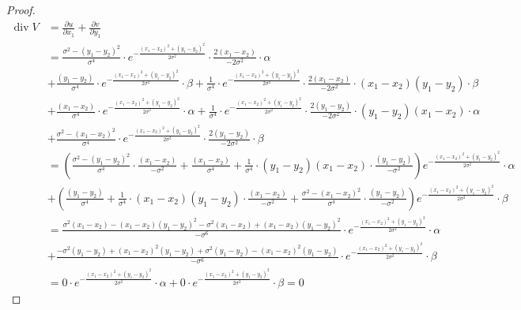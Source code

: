 \documentclass{article}
\theoremstyle{definition}
\theoremstyle{plain}
\begin{document}
\begin{proof}
\begin{align*}
    \operatorname{div} V&=\frac{\partial u}{\partial x_1}+\frac{\partial v}{\partial y_1}\\
    &=\frac{\sigma^2-(y_1-y_2)^2}{\sigma^4}\cdot e^{-\frac{(x_1-x_2)^2+(y_1-y_2)^2}{2\sigma^2}}\cdot\frac{2(x_1-x_2)}{-2\sigma^2}\cdot\alpha\\
    &+\frac{(y_1-y_2)}{\sigma^4}\cdot e^{-\frac{(x_1-x_2)^2+(y_1-y_2)^2}{2\sigma^2}}\cdot\beta+\frac{1}{\sigma^4}\cdot e^{-\frac{(x_1-x_2)^2+(y_1-y_2)^2}{2\sigma^2}}\cdot\frac{2(x_1-x_2)}{-2\sigma^2}\cdot (x_1-x_2)(y_1-y_2)\cdot\beta\\
    &+\frac{(x_1-x_2)}{\sigma^4}\cdot e^{-\frac{(x_1-x_2)^2+(y_1-y_2)^2}{2\sigma^2}}\cdot\alpha+\frac{1}{\sigma^4}\cdot e^{-\frac{(x_1-x_2)^2+(y_1-y_2)^2}{2\sigma^2}}\cdot\frac{2(y_1-y_2)}{-2\sigma^2}\cdot (y_1-y_2)(x_1-x_2)\cdot\alpha\\
    &+\frac{\sigma^2-(x_1-x_2)^2}{\sigma^4}\cdot e^{-\frac{(x_1-x_2)^2+(y_1-y_2)^2}{2\sigma^2}}\cdot\frac{2(y_1-y_2)}{-2\sigma^2}\cdot\beta\\
    &=\left(\frac{\sigma^2-(y_1-y_2)^2}{\sigma^4}\cdot\frac{(x_1-x_2)}{-\sigma^2}+\frac{(x_1-x_2)}{\sigma^4}+\frac{1}{\sigma^4}\cdot (y_1-y_2)(x_1-x_2)\cdot\frac{(y_1-y_2)}{-\sigma^2}\right)e^{-\frac{(x_1-x_2)^2+(y_1-y_2)^2}{2\sigma^2}}\cdot\alpha\\
    &+\left(\frac{(y_1-y_2)}{\sigma^4}+\frac{1}{\sigma^4}\cdot (x_1-x_2)(y_1-y_2)\cdot\frac{(x_1-x_2)}{-\sigma^2}+\frac{\sigma^2-(x_1-x_2)^2}{\sigma^4}\cdot\frac{(y_1-y_2)}{-\sigma^2}\right)e^{-\frac{(x_1-x_2)^2+(y_1-y_2)^2}{2\sigma^2}}\cdot\beta\\
    &=\frac{\sigma^2(x_1-x_2)-(x_1-x_2)(y_1-y_2)^2-\sigma^2(x_1-x_2)+(x_1-x_2)(y_1-y_2)^2}{-\sigma^6}\cdot e^{-\frac{(x_1-x_2)^2+(y_1-y_2)^2}{2\sigma^2}}\cdot\alpha\\
    &+\frac{-\sigma^2(y_1-y_2)+(x_1-x_2)^2(y_1-y_2)+\sigma^2(y_1-y_2)-(x_1-x_2)^2(y_1-y_2)}{-\sigma^6}\cdot e^{-\frac{(x_1-x_2)^2+(y_1-y_2)^2}{2\sigma^2}}\cdot\beta\\
    &=0\cdot e^{-\frac{(x_1-x_2)^2+(y_1-y_2)^2}{2\sigma^2}}\cdot\alpha+0\cdot e^{-\frac{(x_1-x_2)^2+(y_1-y_2)^2}{2\sigma^2}}\cdot\beta=0
\end{align*}
\end{proof}
\end{document}
